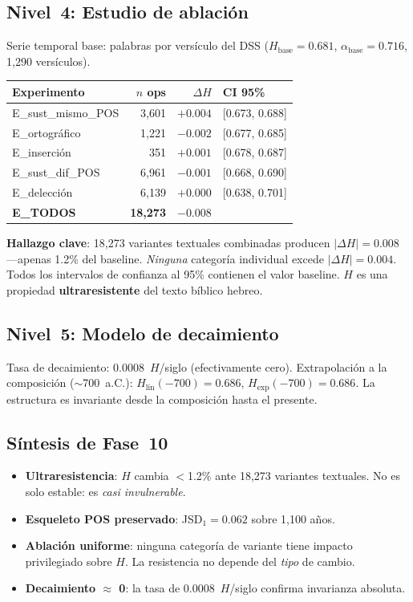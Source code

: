 \documentclass[12pt,a4paper]{article}
\begin{document}
\subsection{Nivel~4: Estudio de ablaci\'on}

Serie temporal base: palabras por vers\'iculo del DSS ($H_{\text{base}} = 0.681$,
$\alpha_{\text{base}} = 0.716$, 1,290 vers\'iculos).

\begin{center}
\begin{tabular}{lrrl}
\toprule
\textbf{Experimento} & \textbf{$n$ ops} & \textbf{$\Delta H$} & \textbf{CI 95\%} \\
\midrule
E\_sust\_mismo\_POS & 3,601 & $+0.004$ & [0.673, 0.688] \\
E\_ortogr\'afico & 1,221 & $-0.002$ & [0.677, 0.685] \\
E\_inserci\'on & 351 & $+0.001$ & [0.678, 0.687] \\
E\_sust\_dif\_POS & 6,961 & $-0.001$ & [0.668, 0.690] \\
E\_delecci\'on & 6,139 & $+0.000$ & [0.638, 0.701] \\
\midrule
\textbf{E\_TODOS} & \textbf{18,273} & \textbf{$-0.008$} & \\
\bottomrule
\end{tabular}
\end{center}

\textbf{Hallazgo clave}: 18,273 variantes textuales combinadas producen
$|\Delta H| = 0.008$ ---apenas 1.2\% del baseline. \emph{Ninguna} categor\'ia
individual excede $|\Delta H| = 0.004$. Todos los intervalos de confianza
al 95\% contienen el valor baseline. $H$ es una propiedad
\textbf{ultraresistente} del texto b\'iblico hebreo.


\subsection{Nivel~5: Modelo de decaimiento}

Tasa de decaimiento: $0.0008$~$H$/siglo (efectivamente cero).
Extrapolaci\'on a la composici\'on ($\sim$700~a.C.):
$H_{\text{lin}}(-700) = 0.686$, $H_{\text{exp}}(-700) = 0.686$.
La estructura es invariante desde la composici\'on hasta el presente.


\subsection{S\'intesis de Fase~10}

\begin{itemize}[leftmargin=2em]
\item \textbf{Ultraresistencia}: $H$ cambia $<$1.2\% ante 18,273 variantes
      textuales. No es solo estable: es \emph{casi invulnerable}.
\item \textbf{Esqueleto POS preservado}: JSD$_1 = 0.062$ sobre 1,100 a\~nos.
\item \textbf{Ablaci\'on uniforme}: ninguna categor\'ia de variante tiene impacto
      privilegiado sobre $H$. La resistencia no depende del \emph{tipo} de cambio.
\item \textbf{Decaimiento $\approx$ 0}: la tasa de $0.0008$~$H$/siglo confirma
      invarianza absoluta.
\end{itemize}
\end{document}
